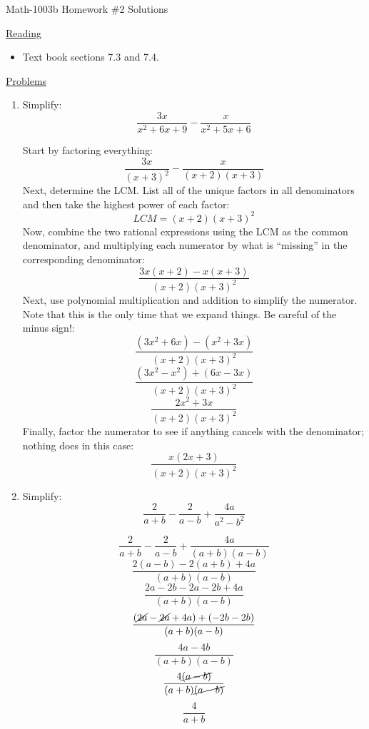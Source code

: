 \documentclass[letterpaper,12pt,fleqn]{article}
\begin{document}
\begin{center}
\Large Math-1003b Homework \#2 Solutions
\end{center}

\vspace{0.5in}

\underline{Reading}

\bigskip

\begin{itemize}
\item Text book sections 7.3 and 7.4.
\end{itemize}

\bigskip

\underline{Problems}

\bigskip

\begin{enumerate}
\item Simplify:
  \[\frac{3x}{x^2+6x+9}-\frac{x}{x^2+5x+6}\]

  Start by factoring everything:
  \[\frac{3x}{(x+3)^2}-\frac{x}{(x+2)(x+3)}\]
  Next, determine the LCM. List all of the unique factors in all denominators
  and then take the highest power of each factor:
  \[LCM=(x+2)(x+3)^2\]
  Now, combine the two rational expressions using the LCM as the common
  denominator, and multiplying each numerator by what is ``missing'' in the
  corresponding denominator:
  \[\frac{3x(x+2)-x(x+3)}{(x+2)(x+3)^2}\]
  Next, use polynomial multiplication and addition to simplify the numerator.
  Note that this is the only time that we expand things. Be careful of the
  minus sign!:
  \[\frac{(3x^2+6x)-(x^2+3x)}{(x+2)(x+3)^2}\]
  \[\frac{(3x^2-x^2)+(6x-3x)}{(x+2)(x+3)^2}\]
  \[\frac{2x^2+3x}{(x+2)(x+3)^2}\]
  Finally, factor the numerator to see if anything cancels with the
  denominator; nothing does in this case:
  \[\frac{x(2x+3)}{(x+2)(x+3)^2}\]

  \bigskip
  
\item Simplify:
  \[\frac{2}{a+b}-\frac{2}{a-b}+\frac{4a}{a^2-b^2}\]

  \bigskip

  \[\frac{2}{a+b}-\frac{2}{a-b}+\frac{4a}{(a+b)(a-b)}\]
  \[\frac{2(a-b)-2(a+b)+4a}{(a+b)(a-b)}\]
  \[\frac{2a-2b-2a-2b+4a}{(a+b)(a-b)}\]
  \[\frac{(\cancel{2a}-\cancel{2a}+4a)+(-2b-2b)}{(a+b)(a-b)}\]
  \[\frac{4a-4b}{(a+b)(a-b)}\]
  \[\frac{4\cancel{(a-b)}}{(a+b)\cancel{(a-b)}}\]
  \[\frac{4}{a+b}\]
\end{enumerate}
\end{document}
